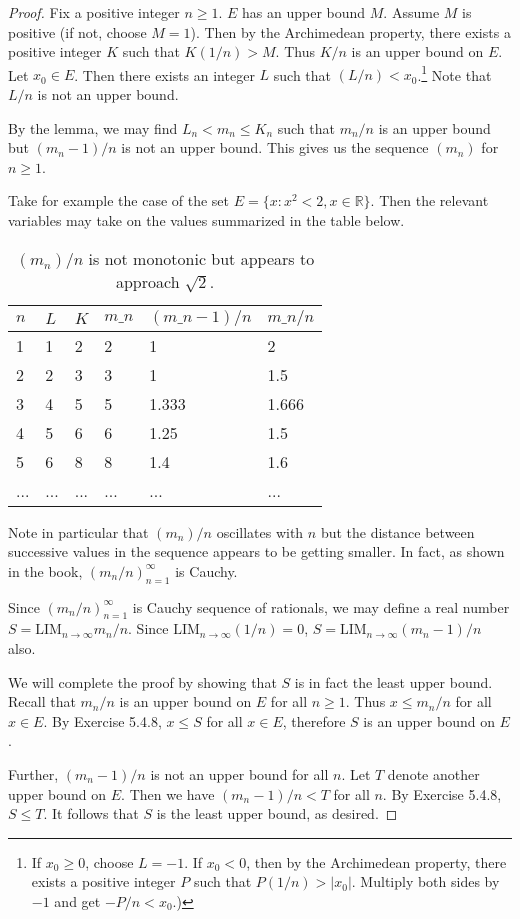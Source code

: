 \documentclass{article}
\newcommand{\real}{{\mathbb{R}}}
\newcommand{\ra}{\rightarrow}
\newcommand{\LIM}{{\mathrm{LIM}}}
\begin{document}
\begin{proof}
Fix a positive integer $n \geq 1$. $E$ has an upper bound $M$. Assume $M$ is positive (if not, choose $M = 1$). Then by the Archimedean property, there exists a positive integer $K$ such that $K (1/n) > M$. Thus $K/n$ is an upper bound on $E$. Let $x_0 \in E$. Then there exists an integer $L$ such that $(L/n) < x_0$.\footnote{If $x_0 \geq 0$, choose $L = -1$. If $x_0 < 0$, then by the Archimedean property, there exists a positive integer $P$ such that $P(1/n) > |x_0|$. Multiply both sides by $-1$ and get $-P/n < x_0$.)} Note that $L/n$ is not an upper bound. 

By the lemma, we may find $L_n < m_n \leq K_n$ such that $m_n/n$ is an upper bound but $(m_n - 1)/n$ is not an upper bound. This gives us the sequence $(m_n)$ for $n \geq 1$.

Take for example the case of the set $E = \{ x : x^2 < 2, x \in \real \}$. Then the relevant variables may take on the values summarized in the table below.

\begin{table}[h]
\begin{tabular}{|l|l|l|l|l|l|}
\hline
$n$ & $L$ & $K$ & $m\_n$ & $(m\_n-1)/n$ & $m\_n/n$ \\ \hline
1 & 1 & 2 & 2    & 1          & 2      \\
2 & 2 & 3 & 3    & 1          & 1.5    \\
3 & 4 & 5 & 5    & 1.333      & 1.666  \\
4 & 5 & 6 & 6    & 1.25       & 1.5    \\
5 & 6 & 8 & 8    & 1.4        & 1.6    \\ 
... & ... & ... & ...    & ...        & ...
\end{tabular}
\caption{\label{tab:lub} $(m_n)/n$ is not monotonic but appears to approach $\sqrt{2}$.}
\end{table}

Note in particular that $(m_n)/n$ oscillates with $n$ but the distance between successive values in the sequence appears to be getting smaller. In fact, as shown in the book, $(m_n/n)_{n = 1}^\infty$ is Cauchy.

Since  $(m_n/n)_{n = 1}^\infty$ is Cauchy sequence of rationals, we may define a real number $S = \LIM_{n \ra \infty} m_n/n$. Since $\LIM_{n \ra \infty} (1/n) = 0$, $S = \LIM_{n \ra \infty} (m_n-1)/n$ also. 

We will complete the proof by showing that $S$ is in fact the least upper bound. Recall that $m_n/n$ is an upper bound on $E$ for all $n \geq 1$. Thus $x \leq m_n/n$ for all $x \in E$. By Exercise 5.4.8, $x \leq S$ for all $x \in E$, therefore $S$ is an upper bound on $E$. 

Further, $(m_n-1)/n$ is not an upper bound for all $n$. Let $T$ denote another upper bound on $E$. Then we have $(m_n-1)/n < T$ for all $n$. By Exercise 5.4.8, $S \leq T$. It follows that $S$ is the least upper bound, as desired.
\end{proof}
\end{document}
